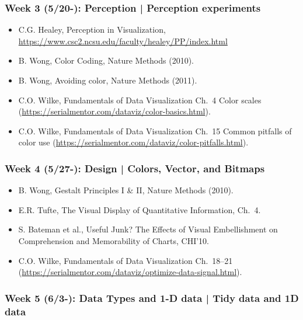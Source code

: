 \documentclass[11pt,article,oneside]{memoir} %
\begin{document}

\subsubsection{Week 3 (5/20-): Perception | Perception experiments }%

\begin{itemize}\itemsep0em 
\item C.G. Healey, Perception in Visualization, \url{https://www.csc2.ncsu.edu/faculty/healey/PP/index.html}
\item B. Wong, Color Coding, Nature Methods (2010).
\item B. Wong, Avoiding color, Nature Methods (2011). 
\item C.O. Wilke, Fundamentals of Data Visualization Ch.~4 Color scales (\url{https://serialmentor.com/dataviz/color-basics.html}). 
\item C.O. Wilke, Fundamentals of Data Visualization Ch.~15 Common pitfalls of color use (\url{https://serialmentor.com/dataviz/color-pitfalls.html}).
\end{itemize}	
\subsubsection{Week 4 (5/27-): Design | Colors, Vector, and Bitmaps }%

\begin{itemize}\itemsep0em 
\item B. Wong, Gestalt Principles I \& II, Nature Methods (2010). 
\item E.R. Tufte, The Visual Display of Quantitative Information, Ch.~4.
\item S. Bateman et al., Useful Junk? The Effects of Visual Embellishment on Comprehension and Memorability of Charts, CHI'10.
\item C.O. Wilke, Fundamentals of Data Visualization Ch.~18--21 (\url{https://serialmentor.com/dataviz/optimize-data-signal.html}). 
\end{itemize}	
\subsubsection{Week 5 (6/3-): Data Types and 1-D data | Tidy data and 1D data } %
\end{document}
